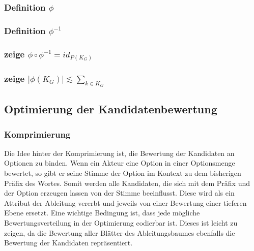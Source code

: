 \documentclass[]{article}
\begin{document}
\subsubsection*{Definition $\phi$}


\subsubsection*{Definition $\phi^{-1}$}


\subsubsection*{zeige $\phi\circ\phi^{-1} = id_{P(K_G)}$}
  

\subsubsection*{zeige $|\phi(K_G)| \lesssim \sum_{k\in K_G}$}



\subsection{Optimierung der Kandidatenbewertung}

\subsubsection*{Komprimierung}
Die Idee hinter der Komprimierung ist, die Bewertung der Kandidaten an Optionen zu binden. Wenn ein Akteur eine Option in einer Optionsmenge bewertet, so gibt er seine Stimme der Option im Kontext zu dem bisherigen Präfix des Wortes. Somit werden alle Kandidaten, die sich mit dem Präfix und der Option erzeugen lassen von der Stimme beeinflusst. Diese wird als ein Attribut der Ableitung vererbt\cite{Knuth1968} und jeweils von einer Bewertung einer tieferen Ebene ersetzt. Eine wichtige Bedingung ist, dass jede mögliche Bewertungsverteilung in der Optimierung codierbar ist. Dieses ist leicht zu zeigen, da die Bewertung aller Blätter des Ableitungsbaumes ebenfalls die Bewertung der Kandidaten repräsentiert.

\end{document}
